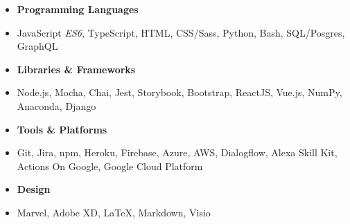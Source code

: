 
\smallskip
{}
\divider

\divider

\begin{itemize}[label={}]
\item \textbf{Programming Languages}
\item JavaScript \textit{ES6}, TypeScript, HTML, CSS/Sass, Python, Bash, SQL/Posgres, GraphQL
\divider
\item \textbf{Libraries \& Frameworks}
\item Node.js, Mocha, Chai, Jest, Storybook, Bootstrap, ReactJS, Vue.js, NumPy, Anaconda, Django
\divider
\item \textbf{Tools \& Platforms}
\item Git, Jira, npm, Heroku, Firebase, Azure, AWS, Dialogflow, Alexa Skill Kit, Actions On Google, Google Cloud Platform
\divider
\item \textbf{Design}
\item Marvel, Adobe XD, \LaTeX, Markdown, Visio
\divider
\end{itemize}

\divider


\bigskip





